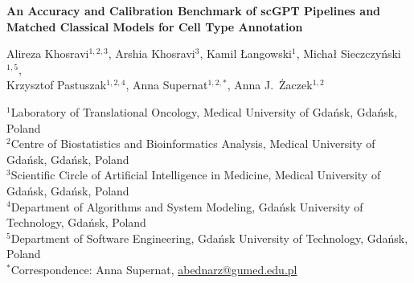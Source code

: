 \documentclass[11pt,a4paper]{article}
\begin{document}
\begin{titlepage}
\begin{center}
\vspace*{0.8cm}
{\LARGE\bfseries An Accuracy and Calibration Benchmark of scGPT Pipelines and Matched Classical Models for Cell Type Annotation\par}
\vspace{1.2cm}
{\large
Alireza Khosravi$^{1,2,3}$, Arshia Khosravi$^{3}$, Kamil {\L}angowski$^{1}$, Micha{\l} Sieczczy{\'n}ski$^{1,5}$,\\[4pt]
Krzysztof Pastuszak$^{1,2,4}$, Anna Supernat$^{1,2,*}$, Anna J.~{\.Z}aczek$^{1,2}$\par}
\vspace{0.8cm}
\begin{minipage}{0.92\textwidth}
\small
$^{1}$Laboratory of Translational Oncology, Medical University of Gda\'nsk, Gda\'nsk, Poland\\
$^{2}$Centre of Biostatistics and Bioinformatics Analysis, Medical University of Gda\'nsk, Gda\'nsk, Poland\\
$^{3}$Scientific Circle of Artificial Intelligence in Medicine, Medical University of Gda\'nsk, Gda\'nsk, Poland\\
$^{4}$Department of Algorithms and System Modeling, Gda\'nsk University of Technology, Gda\'nsk, Poland\\
$^{5}$Department of Software Engineering, Gda\'nsk University of Technology, Gda\'nsk, Poland\\[5pt]
$^{*}$Correspondence: Anna Supernat, \href{mailto:abednarz@gumed.edu.pl}{abednarz@gumed.edu.pl}
\end{minipage}
\vspace{0.9cm}
\end{center}


\end{titlepage}

\onehalfspacing
\linenumbers












\end{document}
